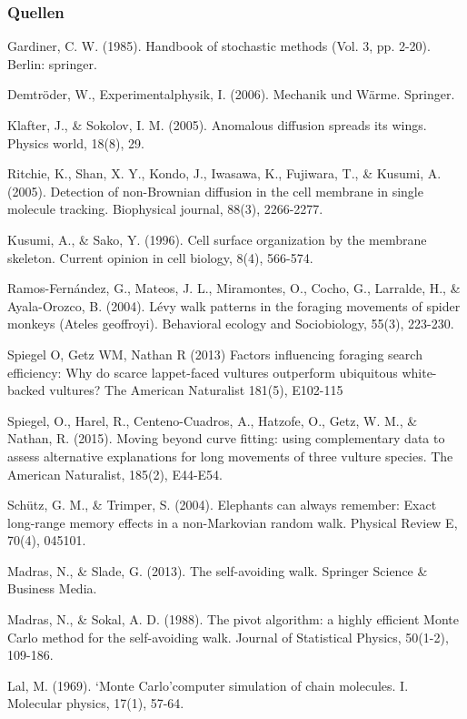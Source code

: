 \documentclass{beamer}
\begin{document}
\begin{frame}
	\frametitle{Quellen}
	\begin{enumerate}[ {[}1{]} ]
		\tiny
		\item Gardiner, C. W. (1985). Handbook of stochastic methods (Vol. 3, pp. 2-20). Berlin: springer.
		\item Demtröder, W., Experimentalphysik, I. (2006). Mechanik und Wärme. Springer.
		\item Klafter, J., \& Sokolov, I. M. (2005). Anomalous diffusion spreads its wings. Physics world, 18(8), 29.
		\item Ritchie, K., Shan, X. Y., Kondo, J., Iwasawa, K., Fujiwara, T., \& Kusumi, A. (2005). Detection of non-Brownian diffusion in the cell membrane in single molecule tracking. Biophysical journal, 88(3), 2266-2277.
		\item Kusumi, A., \& Sako, Y. (1996). Cell surface organization by the membrane skeleton. Current opinion in cell biology, 8(4), 566-574.
		\item Ramos-Fernández, G., Mateos, J. L., Miramontes, O., Cocho, G., Larralde, H., \& Ayala-Orozco, B. (2004). Lévy walk patterns in the foraging movements of spider monkeys (Ateles geoffroyi). Behavioral ecology and Sociobiology, 55(3), 223-230.
		\item Spiegel O, Getz WM, Nathan R (2013) Factors influencing foraging search efficiency: Why do scarce lappet-faced vultures outperform ubiquitous white-backed vultures? The American Naturalist 181(5), E102-115
		\item Spiegel, O., Harel, R., Centeno-Cuadros, A., Hatzofe, O., Getz, W. M., \& Nathan, R. (2015). Moving beyond curve fitting: using complementary data to assess alternative explanations for long movements of three vulture species. The American Naturalist, 185(2), E44-E54.
		\item Schütz, G. M., \& Trimper, S. (2004). Elephants can always remember: Exact long-range memory effects in a non-Markovian random walk. Physical Review E, 70(4), 045101.
		\item Madras, N., \& Slade, G. (2013). The self-avoiding walk. Springer Science \& Business Media.
		\item Madras, N., \& Sokal, A. D. (1988). The pivot algorithm: a highly efficient Monte Carlo method for the self-avoiding walk. Journal of Statistical Physics, 50(1-2), 109-186.
		\item Lal, M. (1969). ‘Monte Carlo’computer simulation of chain molecules. I. Molecular physics, 17(1), 57-64.
	\end{enumerate}
\end{frame}
\end{document}
